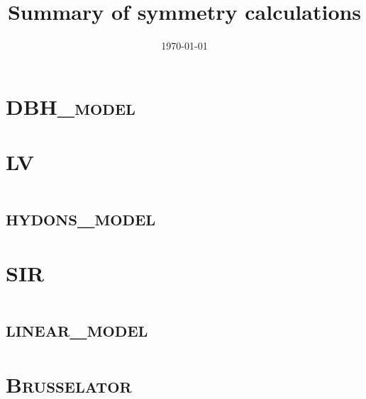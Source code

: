 \documentclass{book}
\begin{document}
\title{\textbf{Summary of symmetry calculations}}
\date{\today}
\maketitle
\tableofcontents
\clearpage
\chapter{\textsc{DBH\_model}}


\chapter{\textsc{LV}}


\chapter{\textsc{hydons\_model}}


\chapter{\textsc{SIR}}


\chapter{\textsc{linear\_model}}


\chapter{\textsc{Brusselator}}

\end{document}
